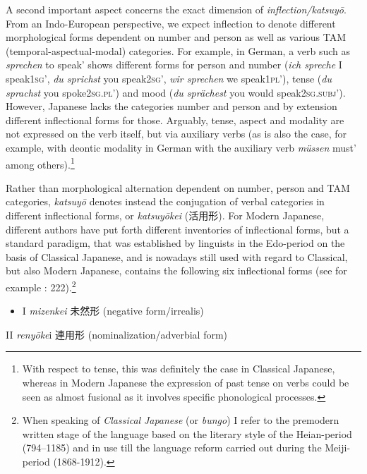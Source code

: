 \documentclass[output=paper]{langscibook}
\begin{document}
A second important aspect concerns the exact dimension of \textit{inflection/katsuyō}. From an Indo-European perspective, we expect inflection to denote different morphological forms dependent on number and person as well as various TAM (temporal-aspectual-modal) categories. For example, in German, a verb such as \textit{sprechen} {\textasciigrave}to speak’ shows different forms for person and number (\textit{ich spreche} {\textasciigrave}I speak\textsc{1sg’}, \textit{du sprichst} {\textasciigrave}you speak\textsc{2sg’}, \textit{wir sprechen} {\textasciigrave}we speak\textsc{1pl’}), tense (\textit{du sprachst} {\textasciigrave}you spoke\textsc{2sg.pl’}) and mood (\textit{du sprächest} {\textasciigrave}you would speak\textsc{2sg.subj’}). However, Japanese lacks the categories number and person and by extension different inflectional forms for those. Arguably, tense, aspect and modality are not expressed on the verb itself, but via auxiliary verbs (as is also the case, for example, with deontic modality in German with the auxiliary verb \textit{müssen} {\textasciigrave}must’ among others).\footnote{With respect to tense, this was definitely the case in Classical Japanese, whereas in Modern Japanese the expression of past tense on verbs could be seen as almost fusional as it involves specific phonological processes.}

Rather than morphological alternation dependent on number, person and TAM categories, \textit{katsuyō} denotes instead the conjugation of verbal categories in different inflectional forms, or \textit{katsuyōkei}\textbf{ }(活用形). For Modern Japanese, different authors have put forth different inventories of inflectional forms, but a standard paradigm, that was established by linguists in the Edo-period on the basis of Classical Japanese, and is nowadays still used with regard to Classical, but also Modern Japanese, contains the following six inflectional forms (see for example \citealt{Shibatani1990}: 222).\footnote{When speaking of \textit{Classical} \textit{Japanese} (or \textit{bungo}) I refer to the premodern written stage of the language based on the literary style of the Heian-period (794–1185) and in use till the language reform carried out during the Meiji-period (1868-1912).}

\begin{itemize}
\item \begin{styleBeispielCinqueKapitel}
I \textit{mizenkei} 未然形 (negative form/irrealis)
\end{styleBeispielCinqueKapitel}
\end{itemize}
\begin{styleBeispielCinqueKapitel}
II \textit{renyōke}i 連用形 (nominalization/adverbial form)
\end{styleBeispielCinqueKapitel}
\end{document}
